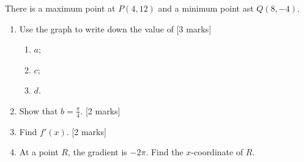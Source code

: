 \documentclass[12pt, twoside]{article}
\begin{document}
\begin{enumerate}
\begin{center}
          \end{center}
          There is a maximum point at $P(4,12)$ and a minimum point ast $Q(8, -4)$.
          \begin{enumerate}
            \item Use the graph to write down the value of [3 marks]
              \begin{enumerate}
                \item $a$;
                \item $c$;
                \item $d$.
              \end{enumerate}
            \item Show that $b= \frac{\pi}{4}$. [2 marks]
            \item Find $f'(x)$. [2 marks]
            \item At a point $R$, the gradient is $-2 \pi$. Find the $x$-coordinate of $R$.
          \end{enumerate}

\end{enumerate}
\end{document}
